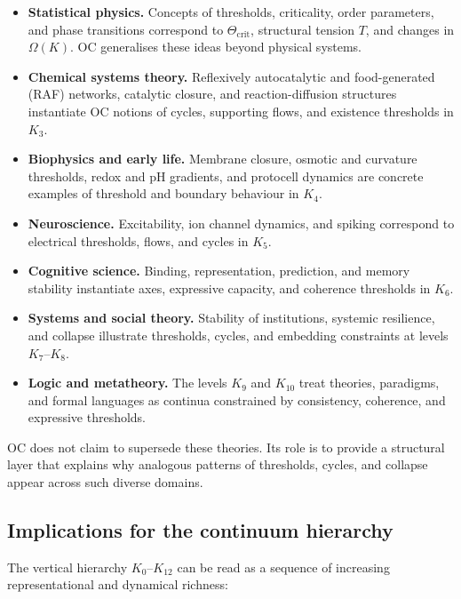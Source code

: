 \begin{itemize}
    \item \textbf{Statistical physics.}
          Concepts of thresholds, criticality, order parameters, and phase transitions correspond to \(\Theta_{\mathrm{crit}}\), structural tension \(T\), and changes in \(\Omega(K)\).
          OC generalises these ideas beyond physical systems.
    \item \textbf{Chemical systems theory.}
          Reflexively autocatalytic and food-generated (RAF) networks, catalytic closure, and reaction-diffusion structures instantiate OC notions of cycles, supporting flows, and existence thresholds in \(K_3\).
    \item \textbf{Biophysics and early life.}
          Membrane closure, osmotic and curvature thresholds, redox and pH gradients, and protocell dynamics are concrete examples of threshold and boundary behaviour in \(K_4\).
    \item \textbf{Neuroscience.}
          Excitability, ion channel dynamics, and spiking correspond to electrical thresholds, flows, and cycles in \(K_5\).
    \item \textbf{Cognitive science.}
          Binding, representation, prediction, and memory stability instantiate axes, expressive capacity, and coherence thresholds in \(K_6\).
    \item \textbf{Systems and social theory.}
          Stability of institutions, systemic resilience, and collapse illustrate thresholds, cycles, and embedding constraints at levels \(K_7\)--\(K_8\).
    \item \textbf{Logic and metatheory.}
          The levels \(K_9\) and \(K_{10}\) treat theories, paradigms, and formal languages as continua constrained by consistency, coherence, and expressive thresholds.
\end{itemize}

OC does not claim to supersede these theories.
Its role is to provide a structural layer that explains why analogous patterns of thresholds, cycles, and collapse appear across such diverse domains.

\subsection{Implications for the continuum hierarchy}

The vertical hierarchy \(K_0\)--\(K_{12}\) can be read as a sequence of increasing representational and dynamical richness:

